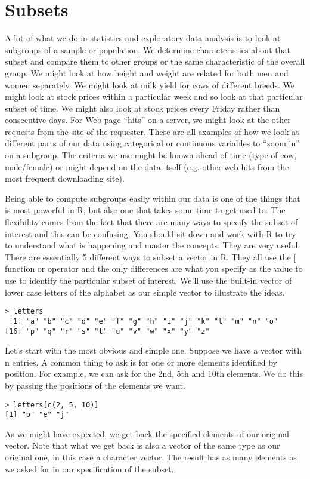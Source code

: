\section{Subsets}
A lot of what we do in statistics and exploratory data analysis is to
look at subgroups of a sample or population. We determine
characteristics about that subset and compare them to other groups or
the same characteristic of the overall group. We might look at how
height and weight are related for both men and women separately. We
might look at milk yield for cows of different breeds. We might look
at stock prices within a particular week and so look at that
particular subset of time. We might also look at stock prices every
Friday rather than consecutive days. For Web page ``hits'' on a server,
we might look at the other requests from the site of the
requester. These are all examples of how we look at different parts of
our data using categorical or continuous variables to ``zoom in'' on a
subgroup. The criteria we use might be known ahead of time (type of
cow, male/female) or might depend on the data itself (e.g. other web
hits from the most frequent downloading site).

Being able to compute subgroups easily within our data is one of the
things that is most powerful in R, but also one that takes some time
to get used to. The flexibility comes from the fact that there are
many ways to specify the subset of interest and this can be
confusing. You should sit down and work with R to try to understand
what is happening and master the concepts. They are very useful. There
are essentially 5 different ways to subset a vector in R. They all use
the [ function or operator and the only differences are what you
specify as the value to use to identify the particular subset of
interest. We'll use the built-in vector of lower case letters of the
alphabet as our simple vector to illustrate the ideas.
\begin{verbatim}
> letters
 [1] "a" "b" "c" "d" "e" "f" "g" "h" "i" "j" "k" "l" "m" "n" "o" 
[16] "p" "q" "r" "s" "t" "u" "v" "w" "x" "y" "z"
\end{verbatim}


Let's start with the most obvious and simple one. Suppose we have a
vector with n entries. A common thing to ask is for one or more
elements identified by position. For example, we can ask for the 2nd,
5th and 10th elements. We do this by passing the positions of the
elements we want.
\begin{verbatim}
> letters[c(2, 5, 10)]
[1] "b" "e" "j"
\end{verbatim}
As we might have expected, we get back the specified elements of our
original vector. Note that what we get back is also a vector of the
same type as our original one, in this case a character vector. The
result has as many elements as we asked for in our specification of
the subset.

